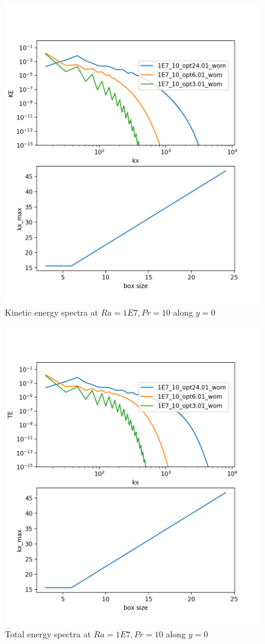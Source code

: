 \documentclass[12pt]{article}
\begin{document}
     \begin{figure}[!htb]
     	\includegraphics[width=\linewidth]{KE_1E7_10.png}
     	\caption{ Kinetic energy spectra at $Ra = 1E7, Pr =10$ along $y = 0$}
     	\label{fig:fig23}
     \end{figure}
     
      \begin{figure}[!htb]
      	\includegraphics[width=\linewidth]{TE_1E7_10.png}
      	\caption{ Total energy spectra at $Ra = 1E7, Pr =10$ along $y = 0$}
      	\label{fig:fig24}
      \end{figure}
     
    
\end{document}
